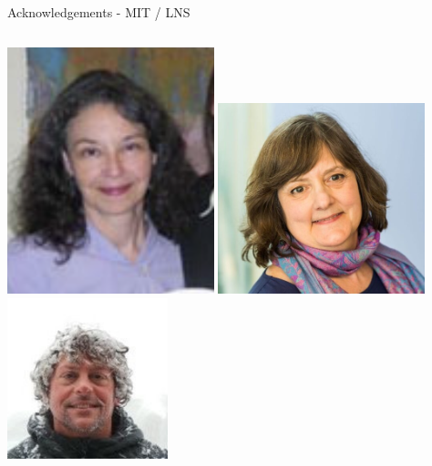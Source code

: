 \documentclass[aspectratio=169]{beamer}
\begin{document}
\begin{frame}{Acknowledgements - MIT / LNS}
\begin{columns}
        \centering
            
            \includegraphics[width=0.45\textwidth]{people/lns/cathy.png}
            \includegraphics[width=0.45\textwidth]{people/lns/sydney.png}
            \includegraphics[width=0.35\textwidth]{people/people/kaufman.png}
            
            
        \end{columns}   
\end{frame}
\end{document}

